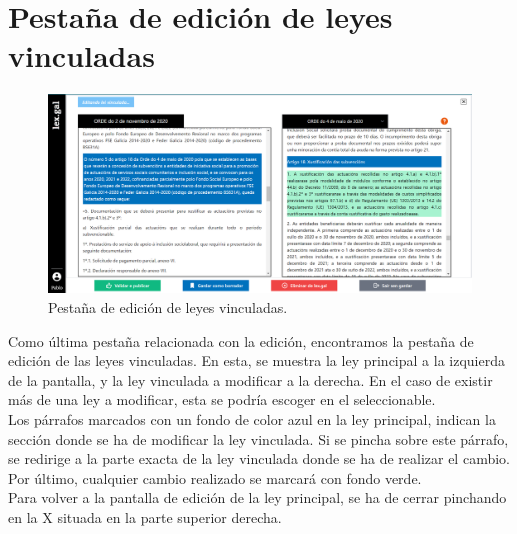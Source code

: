 \section{Pestaña de edición de leyes vinculadas}
\label{PEdicionLeyVinculada}

\begin{figure}[H]
\centerline{\includegraphics[width=15cm]{figuras/manualUsuario/PestanaLeyVinculada.PNG}}
\caption{Pestaña de edición de leyes vinculadas.}
\label{enlacePLeyVinculada}
\end{figure}

Como última pestaña relacionada con la edición, encontramos la pestaña de edición de las leyes vinculadas. En esta, se muestra la ley principal a la izquierda de la pantalla, y la ley vinculada a modificar a la derecha. En el caso de existir más de una ley a modificar, esta se podría escoger en el seleccionable.
\\

Los párrafos marcados con un fondo de color azul en la ley principal, indican la sección donde se ha de modificar la ley vinculada. Si se pincha sobre este párrafo, se redirige a la parte exacta de la ley vinculada donde se ha de realizar el cambio. Por último, cualquier cambio realizado se marcará con fondo verde. 
\\

Para volver a la pantalla de edición de la ley principal, se ha de cerrar pinchando en la X situada en la parte superior derecha.